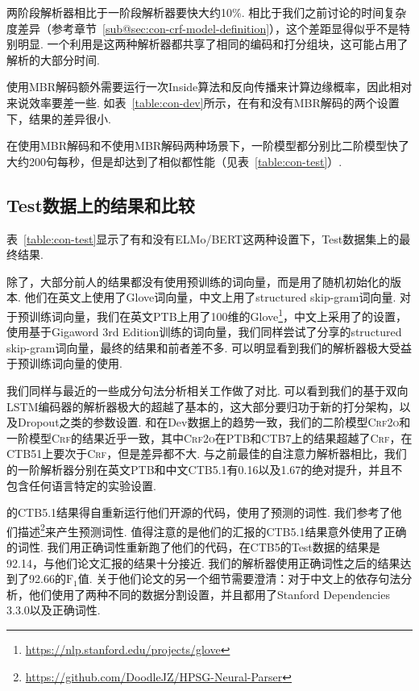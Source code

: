 两阶段解析器相比于一阶段解析器要快大约10\%.
相比于我们之前讨论的时间复杂度差异（参考章节~\ref{sub@sec:con-crf-model-definition}），这个差距显得似乎不是特别明显.
一个利用是这两种解析器都共享了相同的编码和打分组块，这可能占用了解析的大部分时间.

使用MBR解码额外需要运行一次Inside算法和反向传播来计算边缘概率，因此相对来说效率要差一些.
如表~\ref{table:con-dev}所示，在有和没有MBR解码的两个设置下，结果的差异很小.

在使用MBR解码和不使用MBR解码两种场景下，一阶模型都分别比二阶模型快了大约200句每秒，但是却达到了相似都性能（见表~\ref{table:con-test}）.



\subsection{Test数据上的结果和比较}
表~\ref{table:con-test}显示了有和没有ELMo/BERT这两种设置下，Test数据集上的最终结果.

除了\citet{zhou-zhao-2019-head}，大部分前人的结果都没有使用预训练的词向量，而是用了随机初始化的版本.
他们在英文上使用了Glove词向量，中文上用了structured skip-gram词向量.
对于预训练词向量，我们在英文PTB上用了100维的Glove\footnote{\url{https://nlp.stanford.edu/projects/glove}}，中文上采用了\citet{li-etal-2019-attentive}的设置，使用基于Gigaword 3rd Edition训练的词向量，我们同样尝试了\citet{zhou-zhao-2019-head}分享的structured skip-gram词向量，最终的结果和前者差不多.
可以明显看到我们的解析器极大受益于预训练词向量的使用.

我们同样与最近的一些成分句法分析相关工作做了对比.
可以看到我们的基于双向LSTM编码器的解析器极大的超越了基本的\citet{stern-etal-2017-minimal}，这大部分要归功于新的打分架构，以及Dropout之类的参数设置.
和在Dev数据上的趋势一致，我们的二阶模型\textsc{Crf2o}和一阶模型\textsc{Crf}的结果近乎一致，其中\textsc{Crf2o}在PTB和CTB7上的结果超越了\textsc{Crf}，在CTB51上要次于\textsc{Crf}，但是差异都不大.
与之前最佳的自注意力解析器相比\citet{kitaev-klein-2018-constituency}，我们的一阶解析器分别在英文PTB和中文CTB5.1有0.16以及1.67的绝对提升，并且不包含任何语言特定的实验设置.

\citet{zhou-zhao-2019-head}的CTB5.1结果得自重新运行他们开源的代码，使用了预测的词性.
我们参考了他们描述\footnote{\url{https://github.com/DoodleJZ/HPSG-Neural-Parser}}来产生预测词性.
值得注意的是他们的汇报的CTB5.1结果意外使用了正确的词性.
我们用正确词性重新跑了他们的代码，在CTB5的Test数据的结果是92.14，与他们论文汇报的结果十分接近.
我们的解析器使用正确词性之后的结果达到了92.66的$\mathrm{F}_1$值.
关于他们论文的另一个细节需要澄清：对于中文上的依存句法分析，他们使用了两种不同的数据分割设置，并且都用了Stanford Dependencies 3.3.0以及正确词性.

